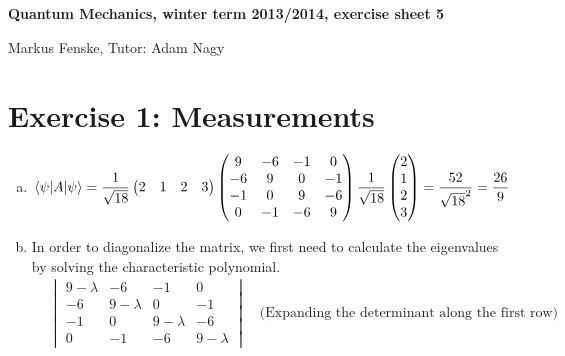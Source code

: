 \documentclass[a4paper,german,12pt,smallheadings]{scrartcl}
\begin{document}
\begin{center}
\bfseries %
\sffamily %
\vspace{-40pt}
Quantum Mechanics, winter term 2013/2014, exercise sheet 5

Markus Fenske, Tutor: Adam Nagy
\vspace{-10pt}
\end{center}

\section*{Exercise 1: Measurements}
\begin{enumerate}[a)]
  \item
    \begin{equation*}
      \braket{\psi|A|\psi} =
      \frac{1}{\sqrt{18}}
      \begin{pmatrix}
        2 & 1 & 2 & 3
      \end{pmatrix}
      \begin{pmatrix}
         9 & -6 & -1 &  0 \\
        -6 &  9 &  0 & -1 \\
        -1 &  0 &  9 & -6 \\
         0 & -1 & -6 &  9
      \end{pmatrix}
      \frac{1}{\sqrt{18}}
      \begin{pmatrix}
       2 \\
       1 \\
       2 \\
       3
      \end{pmatrix}
      = \frac{52}{\sqrt{18}^2} = \frac{26}{9}
    \end{equation*}
  \item
    In order to diagonalize the matrix, we first need to calculate the
    eigenvalues by solving the characteristic polynomial. 
    \begin{align*}
      &\begin{vmatrix}
        9-\lambda & -6        & -1        &  0         \\
        -6        & 9-\lambda & 0         & -1         \\
        -1        & 0         & 9-\lambda & -6         \\
        0         & -1        & -6        &  9-\lambda
      \end{vmatrix} 
      \quad\text{(Expanding the determinant along the first row)}
      \\

\end{align*}
\end{enumerate}
\end{document}
